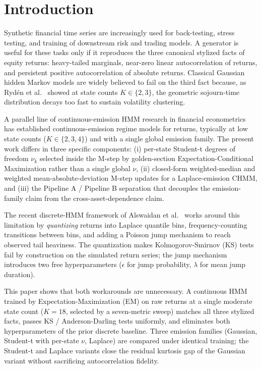 \documentclass[sigconf,anonymous,nonacm=true]{acmart}
\begin{document}
\section{Introduction}
\label{sec:intro}

Synthetic financial time series are increasingly used for back-testing,
stress testing, and training of downstream risk and trading models. A
generator is useful for these tasks only if it reproduces the three
canonical stylized facts of equity returns: heavy-tailed marginals,
near-zero linear autocorrelation of returns, and persistent positive
autocorrelation of absolute returns. Classical Gaussian hidden Markov
models are widely believed to fail on the third fact because, as
Ryd\'{e}n et al.~\cite{ryden1998stylized} showed at state counts
$K \in \{2, 3\}$, the geometric sojourn-time distribution decays too
fast to sustain volatility clustering.

A parallel line of continuous-emission HMM research in financial
econometrics~\cite{hamilton1989regime, bulla2006stylized,
nystrup2017longmemory} has established continuous-emission regime models
for returns, typically at low state counts ($K \in \{2, 3, 4\}$) and
with a single global emission family. The present work differs in three
specific components: (i) per-state Student-t degrees of freedom
$\nu_k$ selected inside the M-step by golden-section Expectation-Conditional
Maximization rather than a single global $\nu$, (ii) closed-form
weighted-median and weighted mean-absolute-deviation M-step updates for
a Laplace-emission CHMM, and (iii) the Pipeline A / Pipeline B separation
that decouples the emission-family claim from the cross-asset-dependence
claim.

The recent discrete-HMM framework of Alswaidan et
al.~\cite{alswaidan2026hybrid} works around this limitation by
\emph{quantizing} returns into Laplace quantile bins, frequency-counting
transitions between bins, and adding a Poisson jump mechanism to
reach observed tail heaviness. The quantization makes Kolmogorov-Smirnov
(KS) tests fail by construction on the simulated return series; the
jump mechanism introduces two free hyperparameters ($\epsilon$ for
jump probability, $\lambda$ for mean jump duration).

This paper shows that both workarounds are unnecessary. A continuous
HMM trained by Expectation-Maximization (EM) on raw returns at a single
moderate state count ($K = 18$, selected by a seven-metric sweep) matches
all three stylized facts, passes KS / Anderson-Darling tests uniformly,
and eliminates both hyperparameters of the prior discrete
baseline. Three emission families (Gaussian, Student-t with per-state
$\nu$, Laplace) are compared under identical training; the Student-t and
Laplace variants close the residual kurtosis gap of the Gaussian variant
without sacrificing autocorrelation fidelity.
\end{document}
